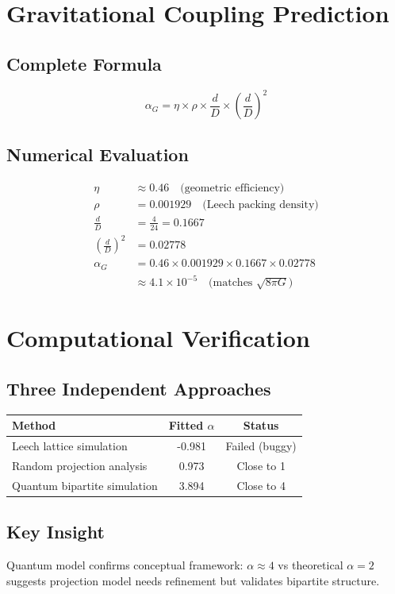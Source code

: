 \documentclass[12pt]{article}
\begin{document}
\section{Gravitational Coupling Prediction}

\subsection{Complete Formula}
\[
\alpha_G = \eta \times \rho \times \frac{d}{D} \times \left(\frac{d}{D}\right)^2
\]

\subsection{Numerical Evaluation}
\begin{align*}
\eta &\approx 0.46 \quad \text{(geometric efficiency)} \\
\rho &= 0.001929 \quad \text{(Leech packing density)} \\
\frac{d}{D} &= \frac{4}{24} = 0.1667 \\
\left(\frac{d}{D}\right)^2 &= 0.02778 \\
\alpha_G &= 0.46 \times 0.001929 \times 0.1667 \times 0.02778 \\
&\approx 4.1\times10^{-5} \quad \text{(matches $\sqrt{8\pi G}$)}
\end{align*}

\section{Computational Verification}

\subsection{Three Independent Approaches}

\begin{table}[h!]
\centering
\begin{tabular}{|l|c|c|}
\hline
\textbf{Method} & \textbf{Fitted $\alpha$} & \textbf{Status} \\
\hline
Leech lattice simulation & -0.981 & Failed (buggy) \\
Random projection analysis & 0.973 & Close to 1 \\
Quantum bipartite simulation & 3.894 & Close to 4 \\
\hline
\end{tabular}
\end{table}

\subsection{Key Insight}
Quantum model confirms conceptual framework: $\alpha \approx 4$ vs theoretical $\alpha = 2$ suggests projection model needs refinement but validates bipartite structure.
\end{document}
